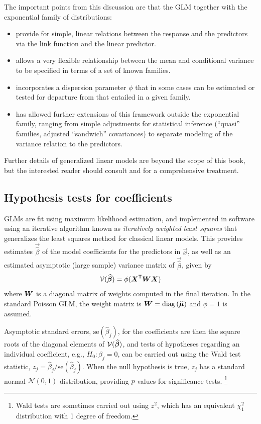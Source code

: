 \documentclass[11pt]{book}\usepackage[]{graphicx}\usepackage[]{color}
\begin{document}
The important points from this discussion are that the GLM together with the exponential
family of distributions:
\begin{itemize}
 \item provide for simple, linear relations between the response and the predictors
 via the link function and the linear predictor.
 \item allows a very flexible relationship between the mean and
 conditional variance to be specified in terms of a set of known families.
 \item incorporates a dispersion parameter $\phi$ that in some cases can be estimated
 or tested for departure from that entailed in a given family.
 \item has allowed further extensions of this framework outside the exponential family,
 ranging from simple adjustments for statistical inference (``quasi'' families,
 adjusted ``sandwich'' covariances) to separate modeling of the variance relation
 to the predictors.
\end{itemize}

Further details of generalized linear models are beyond the scope of this book, but
the interested reader should consult \citet[\S 15.3]{Fox:2008}
and \citet[Ch. 4]{Agresti:2013} for a comprehensive
treatment.

\subsection{Hypothesis tests for coefficients}\label{sec:glm-hyptests}
GLMs are fit using maximum likelihood estimation, and implemented in software using
an iterative algorithm known as \emph{iteratively weighted least squares}
that generalizes the least squares method for classical linear models.
This provides estimates $\vec{\widehat{\beta}}$ of the model coefficients
for the predictors in $\vec{x}$, as well as an estimated asymptotic
(large sample) variance matrix of $\vec{\widehat{\beta}}$, given by
\begin{equation}\label{eq:varbeta}
\mathcal{V} (\widehat{\bm{\beta}}) = \phi ( \bm{X}^\mathsf{T}  \bm{W} \bm{X} )
\end{equation}
where $\bm{W}$ is a diagonal matrix of weights computed in the final iteration.
In the standard Poisson GLM, the weight matrix is $\bm{W} = \mathrm{diag}\, (\widehat{\bm{\mu}})$
and $\phi=1$ is assumed.

Asymptotic standard errors, $ \mathrm{se} (\widehat{\beta}_j)$,
for the coefficients are then the square roots of the
diagonal elements
of $\mathcal{V} (\widehat{\bm{\beta}})$, and tests of hypotheses regarding
an individual coefficient, e.g., $H_0 : \beta_j = 0$, can be carried out
using the Wald test statistic,
$z_j = \widehat{\beta}_j / \mathrm{se} (\widehat{\beta}_j)$.
When the null hypothesis is true, $z_j$ has a standard normal $\mathcal{N}(0,1)$
distribution, providing $p$-values for significance tests.%
\footnote{Wald tests are sometimes carried out using $z^2$, which has an equivalent
$\chi^2_1$ distribution with 1 degree of freedom.
}
\end{document}
